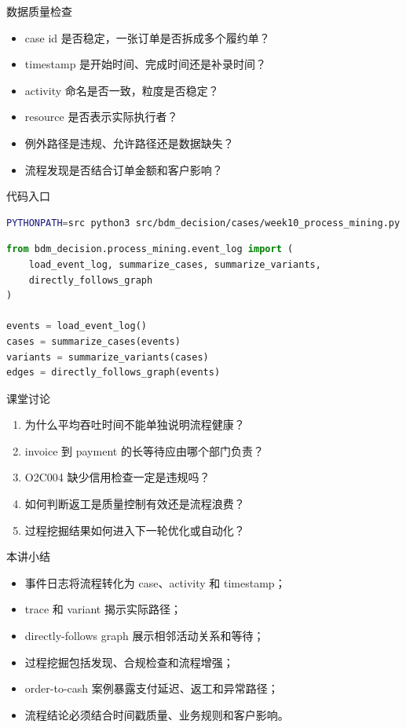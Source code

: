 \documentclass[UTF8,fontset=fandol,aspectratio=169,11pt]{ctexbeamer}
\begin{document}
\begin{frame}{数据质量检查}
\begin{itemize}
  \item case id 是否稳定，一张订单是否拆成多个履约单？
  \item timestamp 是开始时间、完成时间还是补录时间？
  \item activity 命名是否一致，粒度是否稳定？
  \item resource 是否表示实际执行者？
  \item 例外路径是违规、允许路径还是数据缺失？
  \item 流程发现是否结合订单金额和客户影响？
\end{itemize}
\end{frame}

\begin{frame}[fragile]{代码入口}
\begin{lstlisting}[language=bash]
PYTHONPATH=src python3 src/bdm_decision/cases/week10_process_mining.py
\end{lstlisting}

\begin{lstlisting}[language=Python]
from bdm_decision.process_mining.event_log import (
    load_event_log, summarize_cases, summarize_variants,
    directly_follows_graph
)

events = load_event_log()
cases = summarize_cases(events)
variants = summarize_variants(cases)
edges = directly_follows_graph(events)
\end{lstlisting}
\end{frame}

\begin{frame}{课堂讨论}
\begin{enumerate}
  \item 为什么平均吞吐时间不能单独说明流程健康？
  \item invoice 到 payment 的长等待应由哪个部门负责？
  \item O2C004 缺少信用检查一定是违规吗？
  \item 如何判断返工是质量控制有效还是流程浪费？
  \item 过程挖掘结果如何进入下一轮优化或自动化？
\end{enumerate}
\end{frame}

\begin{frame}{本讲小结}
\begin{itemize}
  \item 事件日志将流程转化为 case、activity 和 timestamp；
  \item trace 和 variant 揭示实际路径；
  \item directly-follows graph 展示相邻活动关系和等待；
  \item 过程挖掘包括发现、合规检查和流程增强；
  \item order-to-cash 案例暴露支付延迟、返工和异常路径；
  \item 流程结论必须结合时间戳质量、业务规则和客户影响。
\end{itemize}
\end{frame}
\end{document}
